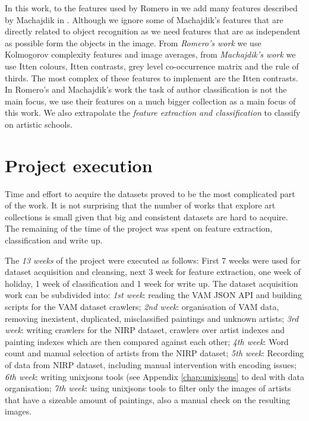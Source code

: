 \documentclass[11pt,a4paper,twoside,openright,draft]{report}
\begin{document}
\begin{multicols}{2}
In this work, to the features used by Romero in \cite{rmc12ajs} we add many
features described by Machajdik in \cite{mach10clas}.  Although we ignore some
of Machajdik's features that are directly related to object recognition as we
need features that are as independent as possible form the objects in the
image.  From \emph{Romero's work} we use Kolmogorov complexity features and
image averages, from \emph{Machajdik's work} we use Itten colours, Itten
contrasts, grey level co-occurrence matrix and the rule of thirds.  The most
complex of these features to implement are the Itten contrasts.  In Romero's
and Machajdik's work the task of author classification is not the main focus,
we use their features on a much bigger collection as a main focus of this work.
We also extrapolate the \emph{feature extraction and classification} to
classify on artistic schools.

\section{Project execution}

Time and effort to acquire the datasets proved to be the most complicated part
of the work.  It is not surprising that the number of works that explore art
collections is small given that big and consistent datasets are hard to
acquire.  The remaining of the time of the project was spent on feature
extraction, classification and write up.

The \emph{13 weeks} of the project were executed as follows: First 7 weeks were
used for dataset acquisition and cleansing, next 3 week for feature extraction,
one week of holiday, 1 week of classification and 1 week for write up.  The
dataset acquisition work can be subdivided into: \emph{1st week}: reading the
VAM JSON API and building scripts for the VAM dataset crawlers; \emph{2nd
week}: organisation of VAM data, removing inexistent, duplicated, misclassified
paintings and unknown artists;  \emph{3rd week}: writing crawlers for the NIRP
dataset, crawlers over artist indexes and painting indexes which are then
compared against each other;  \emph{4th week}: Word count and manual selection
of artists from the NIRP dataset;  \emph{5th week}: Recording of data from NIRP
dataset, including manual intervention with encoding issues;  \emph{6th week}:
writing unixjsons tools (see Appendix \ref{chap:unixjsons} to deal with data
organisation;  \emph{7th week}: using unixjsons tools to filter only the images
of artists that have a sizeable amount of paintings, also a manual check on the
resulting images.


\end{multicols}
\end{document}

